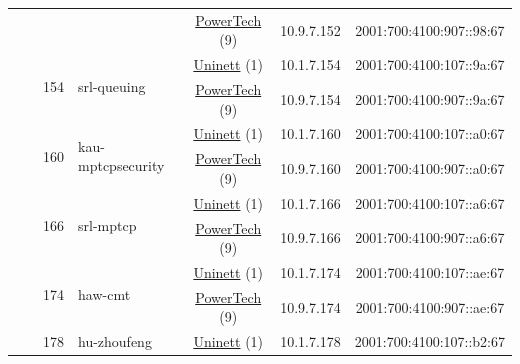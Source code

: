 \begin{small}
\begin{center}
\begin{longtable}{|c|c|c|c|c|c|c|c|}
  &  &  &  & \multicolumn{2}{|c|}{\tiny{\href{http://www.powertech.no}{PowerTech} (9)}} & \tiny{10.9.7.152} & \tiny{2001:700:4100:907::98:67} \\* \cline{3-3}\cline{4-4}\cline{5-5}\cline{6-6}\cline{7-7}\cline{8-8}
  &  & \multirow{2}{*}{\tiny{154}} & \multicolumn{1}{|l|}{\multirow{2}{*}{\tiny{srl-queuing}}} & \multicolumn{2}{|c|}{\tiny{\href{https://www.uninett.no}{Uninett} (1)}} & \tiny{10.1.7.154} & \tiny{2001:700:4100:107::9a:67} \\* \cline{5-5}\cline{6-6}\cline{7-7}\cline{8-8}
  &  &  &  & \multicolumn{2}{|c|}{\tiny{\href{http://www.powertech.no}{PowerTech} (9)}} & \tiny{10.9.7.154} & \tiny{2001:700:4100:907::9a:67} \\* \cline{3-3}\cline{4-4}\cline{5-5}\cline{6-6}\cline{7-7}\cline{8-8}
  &  & \multirow{2}{*}{\tiny{160}} & \multicolumn{1}{|l|}{\multirow{2}{*}{\tiny{kau-mptcpsecurity}}} & \multicolumn{2}{|c|}{\tiny{\href{https://www.uninett.no}{Uninett} (1)}} & \tiny{10.1.7.160} & \tiny{2001:700:4100:107::a0:67} \\* \cline{5-5}\cline{6-6}\cline{7-7}\cline{8-8}
  &  &  &  & \multicolumn{2}{|c|}{\tiny{\href{http://www.powertech.no}{PowerTech} (9)}} & \tiny{10.9.7.160} & \tiny{2001:700:4100:907::a0:67} \\* \cline{3-3}\cline{4-4}\cline{5-5}\cline{6-6}\cline{7-7}\cline{8-8}
  &  & \multirow{2}{*}{\tiny{166}} & \multicolumn{1}{|l|}{\multirow{2}{*}{\tiny{srl-mptcp}}} & \multicolumn{2}{|c|}{\tiny{\href{https://www.uninett.no}{Uninett} (1)}} & \tiny{10.1.7.166} & \tiny{2001:700:4100:107::a6:67} \\* \cline{5-5}\cline{6-6}\cline{7-7}\cline{8-8}
  &  &  &  & \multicolumn{2}{|c|}{\tiny{\href{http://www.powertech.no}{PowerTech} (9)}} & \tiny{10.9.7.166} & \tiny{2001:700:4100:907::a6:67} \\* \cline{3-3}\cline{4-4}\cline{5-5}\cline{6-6}\cline{7-7}\cline{8-8}
  &  & \multirow{2}{*}{\tiny{174}} & \multicolumn{1}{|l|}{\multirow{2}{*}{\tiny{haw-cmt}}} & \multicolumn{2}{|c|}{\tiny{\href{https://www.uninett.no}{Uninett} (1)}} & \tiny{10.1.7.174} & \tiny{2001:700:4100:107::ae:67} \\* \cline{5-5}\cline{6-6}\cline{7-7}\cline{8-8}
  &  &  &  & \multicolumn{2}{|c|}{\tiny{\href{http://www.powertech.no}{PowerTech} (9)}} & \tiny{10.9.7.174} & \tiny{2001:700:4100:907::ae:67} \\* \cline{3-3}\cline{4-4}\cline{5-5}\cline{6-6}\cline{7-7}\cline{8-8}
  &  & \multirow{2}{*}{\tiny{178}} & \multicolumn{1}{|l|}{\multirow{2}{*}{\tiny{hu-zhoufeng}}} & \multicolumn{2}{|c|}{\tiny{\href{https://www.uninett.no}{Uninett} (1)}} & \tiny{10.1.7.178} & \tiny{2001:700:4100:107::b2:67} \\* \cline{5-5}\cline{6-6}\cline{7-7}\cline{8-8}

\end{longtable}
\end{center}
\end{small}

